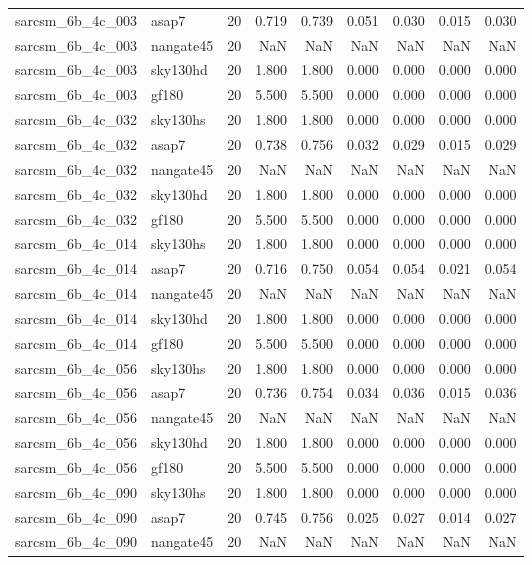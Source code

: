 \begin{tabular}{llrrrrrrr}
sarcsm\_6b\_4c\_003 & asap7 & 20 & 0.719 & 0.739 & 0.051 & 0.030 & 0.015 & 0.030 \\
sarcsm\_6b\_4c\_003 & nangate45 & 20 & NaN & NaN & NaN & NaN & NaN & NaN \\
sarcsm\_6b\_4c\_003 & sky130hd & 20 & 1.800 & 1.800 & 0.000 & 0.000 & 0.000 & 0.000 \\
sarcsm\_6b\_4c\_003 & gf180 & 20 & 5.500 & 5.500 & 0.000 & 0.000 & 0.000 & 0.000 \\
sarcsm\_6b\_4c\_032 & sky130hs & 20 & 1.800 & 1.800 & 0.000 & 0.000 & 0.000 & 0.000 \\
sarcsm\_6b\_4c\_032 & asap7 & 20 & 0.738 & 0.756 & 0.032 & 0.029 & 0.015 & 0.029 \\
sarcsm\_6b\_4c\_032 & nangate45 & 20 & NaN & NaN & NaN & NaN & NaN & NaN \\
sarcsm\_6b\_4c\_032 & sky130hd & 20 & 1.800 & 1.800 & 0.000 & 0.000 & 0.000 & 0.000 \\
sarcsm\_6b\_4c\_032 & gf180 & 20 & 5.500 & 5.500 & 0.000 & 0.000 & 0.000 & 0.000 \\
sarcsm\_6b\_4c\_014 & sky130hs & 20 & 1.800 & 1.800 & 0.000 & 0.000 & 0.000 & 0.000 \\
sarcsm\_6b\_4c\_014 & asap7 & 20 & 0.716 & 0.750 & 0.054 & 0.054 & 0.021 & 0.054 \\
sarcsm\_6b\_4c\_014 & nangate45 & 20 & NaN & NaN & NaN & NaN & NaN & NaN \\
sarcsm\_6b\_4c\_014 & sky130hd & 20 & 1.800 & 1.800 & 0.000 & 0.000 & 0.000 & 0.000 \\
sarcsm\_6b\_4c\_014 & gf180 & 20 & 5.500 & 5.500 & 0.000 & 0.000 & 0.000 & 0.000 \\
sarcsm\_6b\_4c\_056 & sky130hs & 20 & 1.800 & 1.800 & 0.000 & 0.000 & 0.000 & 0.000 \\
sarcsm\_6b\_4c\_056 & asap7 & 20 & 0.736 & 0.754 & 0.034 & 0.036 & 0.015 & 0.036 \\
sarcsm\_6b\_4c\_056 & nangate45 & 20 & NaN & NaN & NaN & NaN & NaN & NaN \\
sarcsm\_6b\_4c\_056 & sky130hd & 20 & 1.800 & 1.800 & 0.000 & 0.000 & 0.000 & 0.000 \\
sarcsm\_6b\_4c\_056 & gf180 & 20 & 5.500 & 5.500 & 0.000 & 0.000 & 0.000 & 0.000 \\
sarcsm\_6b\_4c\_090 & sky130hs & 20 & 1.800 & 1.800 & 0.000 & 0.000 & 0.000 & 0.000 \\
sarcsm\_6b\_4c\_090 & asap7 & 20 & 0.745 & 0.756 & 0.025 & 0.027 & 0.014 & 0.027 \\
sarcsm\_6b\_4c\_090 & nangate45 & 20 & NaN & NaN & NaN & NaN & NaN & NaN \\

\end{tabular}
